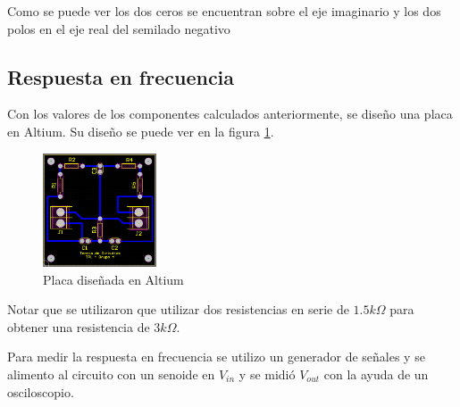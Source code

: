 Como se puede ver los dos ceros se encuentran sobre el eje imaginario y los dos polos en el eje real del semilado negativo


\begin{center}
    \end{center}

\subsection{Respuesta en frecuencia}
Con los valores de los componentes calculados anteriormente, se diseño una placa en Altium. Su diseño se 
puede ver en la figura \ref{fig:placa_altium}.

\begin{figure}[H]                                                       
    \centering\includegraphics[width=0.3\textwidth]{resources/placa_altium.png}
    \caption{Placa diseñada en Altium}
    \label{fig:placa_altium}
    \end{figure}

Notar que se utilizaron que utilizar dos resistencias en serie de $1.5k\Omega$ para obtener una
resistencia de $3k\Omega$. 

Para medir la respuesta en frecuencia se utilizo un generador de señales y se alimento al circuito con un senoide en $V_{in}$ y se midió $V_{out}$ con la ayuda de un osciloscopio.

